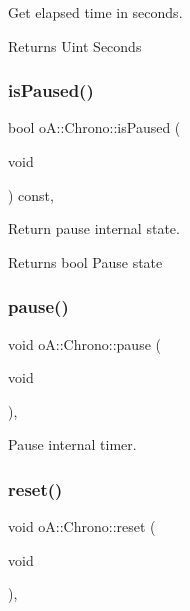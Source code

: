 Get elapsed time in seconds. 

\begin{DoxyReturn}{Returns}
Uint Seconds 
\end{DoxyReturn}
\mbox{\label{classo_a_1_1_chrono_aeeaed136925a70bd668648b0a99b3f8e}} 
\subsubsection{\texorpdfstring{is\+Paused()}{isPaused()}}
{\footnotesize\ttfamily bool o\+A\+::\+Chrono\+::is\+Paused (\begin{DoxyParamCaption}\item[{void}]{ }\end{DoxyParamCaption}) const\hspace{0.3cm}{\ttfamily [inline]}, {\ttfamily [noexcept]}}



Return pause internal state. 

\begin{DoxyReturn}{Returns}
bool Pause state 
\end{DoxyReturn}
\mbox{\label{classo_a_1_1_chrono_a64646924bdd219e72b58999745928fe6}} 
\subsubsection{\texorpdfstring{pause()}{pause()}}
{\footnotesize\ttfamily void o\+A\+::\+Chrono\+::pause (\begin{DoxyParamCaption}\item[{void}]{ }\end{DoxyParamCaption})\hspace{0.3cm}{\ttfamily [inline]}, {\ttfamily [noexcept]}}



Pause internal timer. 

\mbox{\label{classo_a_1_1_chrono_a16943e5e5a0a768cd5b1a7af2deed739}} 
\subsubsection{\texorpdfstring{reset()}{reset()}}
{\footnotesize\ttfamily void o\+A\+::\+Chrono\+::reset (\begin{DoxyParamCaption}\item[{void}]{ }\end{DoxyParamCaption})\hspace{0.3cm}{\ttfamily [inline]}, {\ttfamily [noexcept]}}



